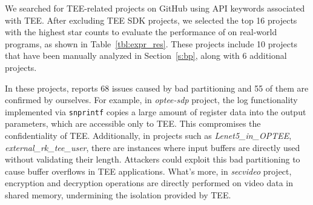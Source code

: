 
We searched for TEE-related projects on GitHub using API keywords associated with TEE. 
After excluding TEE SDK projects, we selected the top 16 projects with the highest star counts to evaluate the performance of \ccSysName on real-world programs, as shown in Table~\ref{tbl:expr_res}. 
These projects include 10 projects that have been manually analyzed in Section~\ref{s:bp}, along with 6 additional projects.

In these projects, \ccSysName reports 68 issues caused by bad partitioning and 55 of them are confirmed by ourselves.
For example, in \textit{optee-sdp} project, the log functionality implemented via \texttt{snprintf} copies a large amount of register data into the output parameters, which are accessible only to TEE. This compromises the confidentiality of TEE.
Additionally, in projects such as \textit{Lenet5\_in\_OPTEE},  \textit{external\_rk\_tee\_user}, there are instances where input buffers are directly used without validating their length.
Attackers could exploit this bad partitioning to cause buffer overflows in TEE applications.
What's more, in \textit{secvideo} project, encryption and decryption operations are directly performed on video data in shared memory, undermining the isolation provided by TEE.

